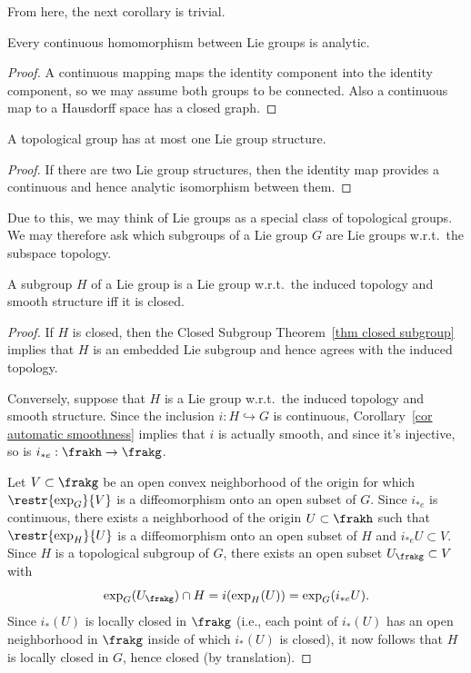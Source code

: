 From here, the next corollary is trivial.
\begin{cor}\label{cor automatic smoothness}
    Every continuous homomorphism between Lie groups is analytic.
\end{cor}
\begin{proof}
    A continuous mapping maps the identity component into the identity component, so we may assume both groups to be connected. Also a continuous map to a Hausdorff space has a closed graph.
\end{proof}
\begin{cor}
    A topological group has at most one Lie group structure.
\end{cor}
\begin{proof}
    If there are two Lie group structures, then the identity map provides a continuous and hence analytic isomorphism between them.
\end{proof}

Due to this, we may think of Lie groups as a special class of topological groups. We may therefore ask which subgroups of a Lie group $G$ are Lie groups w.r.t.\ the subspace topology.

\begin{prop}[{{\cite[Prop.~9.3.9]{HN}}}]\label{prop 9.3.9 HN}
    A subgroup $H$ of a Lie group is a Lie group w.r.t.\ the induced topology and smooth structure iff it is closed.
\end{prop}
\begin{proof}
    If $H$ is closed, then the Closed Subgroup Theorem~\ref{thm closed subgroup} implies that $H$ is an embedded Lie subgroup and hence agrees with the induced topology.

    Conversely, suppose that $H$ is a Lie group w.r.t.\ the induced topology and smooth structure. Since the inclusion $i:H\hookrightarrow G$ is continuous, Corollary~\ref{cor automatic smoothness} implies that $i$ is actually smooth, and since it's injective, so is $i_{\ast e}:\frakh\to\frakg$.

    Let $V\subset \frakg$ be an open convex neighborhood of the origin for which $\restr{\exp_G}{V}$ is a diffeomorphism onto an open subset of $G$. Since $i_{\ast e}$ is continuous, there exists a neighborhood of the origin $U\subset \frakh$ such that $\restr{\exp_H}{U}$ is a diffeomorphism onto an open subset of $H$ and $i_{\ast e} U\subset V$. Since $H$ is a topological subgroup of $G$, there exists an open subset $U_\frakg\subset V$ with
    \[\exp_G(U_\frakg)\cap H=i(\exp_H(U))=\exp_G(i_{\ast e} U).\]
    Since $i_\ast(U)$ is locally closed in $\frakg$ (i.e., each point of $i_\ast(U)$ has an open neighborhood in $\frakg$ inside of which $i_\ast(U)$ is closed), it now follows that $H$ is locally closed in $G$, hence closed (by translation).
\end{proof}


